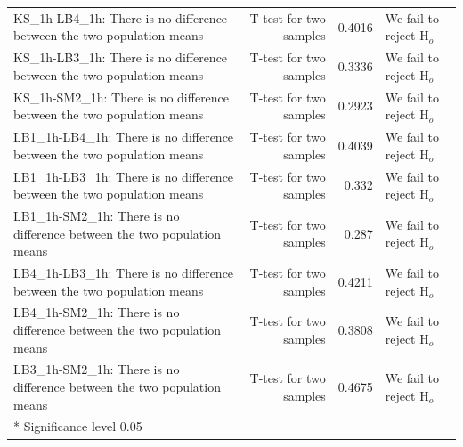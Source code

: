\begin{table}[H]
{\begin{tabular}{lrr>{\RaggedRight}p{2.7cm}}
KS\_1h-LB4\_1h: There is no difference between the two population means & T-test for two samples & 0.4016 & We fail to reject $\text{H}_o$ \\
KS\_1h-LB3\_1h: There is no difference between the two population means & T-test for two samples & 0.3336 & We fail to reject $\text{H}_o$ \\
KS\_1h-SM2\_1h: There is no difference between the two population means & T-test for two samples & 0.2923 & We fail to reject $\text{H}_o$ \\
LB1\_1h-LB4\_1h: There is no difference between the two population means & T-test for two samples & 0.4039 & We fail to reject $\text{H}_o$ \\
LB1\_1h-LB3\_1h: There is no difference between the two population means & T-test for two samples & 0.332 & We fail to reject $\text{H}_o$ \\
LB1\_1h-SM2\_1h: There is no difference between the two population means & T-test for two samples & 0.287 & We fail to reject $\text{H}_o$ \\
LB4\_1h-LB3\_1h: There is no difference between the two population means & T-test for two samples & 0.4211 & We fail to reject $\text{H}_o$ \\
LB4\_1h-SM2\_1h: There is no difference between the two population means & T-test for two samples & 0.3808 & We fail to reject $\text{H}_o$ \\
LB3\_1h-SM2\_1h: There is no difference between the two population means & T-test for two samples & 0.4675 & We fail to reject $\text{H}_o$ \\
\bottomrule
*  Significance level 0.05
\end{tabular}
}
\end{table}



